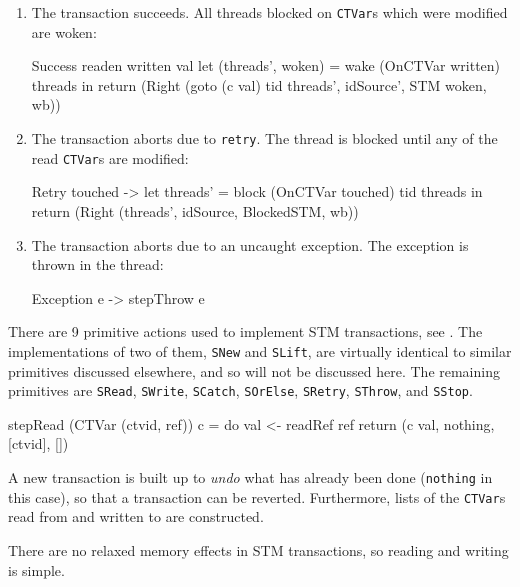 \begin{enumerate}
\item The transaction succeeds. All threads blocked on \verb|CTVar|s
  which were modified are woken:

\begin{haskellcode}
    Success readen written val
      let (threads', woken) = wake (OnCTVar written) threads
      in return (Right (goto (c val) tid threads', idSource', STM woken, wb))
\end{haskellcode}

\item The transaction aborts due to \verb|retry|. The thread is
  blocked until any of the read \verb|CTVar|s are modified:

\begin{haskellcode}
    Retry touched ->
      let threads' = block (OnCTVar touched) tid threads
      in return (Right (threads', idSource, BlockedSTM, wb))
\end{haskellcode}

\item The transaction aborts due to an uncaught exception. The
  exception is thrown in the thread:

\begin{haskellcode}
    Exception e -> stepThrow e
\end{haskellcode}

\end{enumerate}

There are 9 primitive actions used to implement STM transactions, see
. The implementations of two of them,
\verb|SNew| and \verb|SLift|, are virtually identical to similar
primitives discussed elsewhere, and so will not be discussed here. The
remaining primitives are \verb|SRead|, \verb|SWrite|, \verb|SCatch|,
\verb|SOrElse|, \verb|SRetry|, \verb|SThrow|, and \verb|SStop|.

\begin{haskellcode}
stepRead (CTVar (ctvid, ref)) c = do
  val <- readRef ref
  return (c val, nothing, [ctvid], [])
\end{haskellcode}

A new transaction is built up to \emph{undo} what has already been
done (\verb|nothing| in this case), so that a transaction can be
reverted. Furthermore, lists of the \verb|CTVar|s read from and
written to are constructed.

There are no relaxed memory effects in STM transactions, so reading
and writing is simple.

